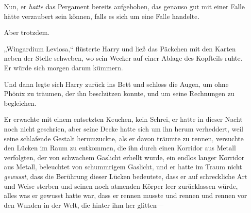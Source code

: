 Nun, er \emph{hatte} das Pergament bereits aufgehoben, das genauso gut mit einer Falle hätte verzaubert sein können, falls es sich um eine Falle handelte.

Aber trotzdem.

„Wingardium Leviosa,“ flüsterte Harry und ließ das Päckchen mit den Karten neben der Stelle schweben, wo sein Wecker auf einer Ablage des Kopfteils ruhte. Er würde sich morgen darum kümmern.

Und dann legte sich Harry zurück ins Bett und schloss die Augen, um ohne Phönix zu träumen, der ihn beschützen konnte, und um seine Rechnungen zu begleichen.

\later

Er erwachte mit einem entsetzten Keuchen, kein Schrei, er hatte in dieser Nacht noch nicht geschrien, aber seine Decke hatte sich um ihn herum verheddert, weil seine schlafende Gestalt herumzuckte, als er davon träumte zu rennen, versuchte den Lücken im Raum zu entkommen, die ihn durch einen Korridor aus Metall verfolgten, der von schwachem Gaslicht erhellt wurde, ein endlos langer Korridor aus Metall, beleuchtet von schummrigem Gaslicht, und er hatte im Traum nicht \emph{gewusst}, dass die Berührung dieser Lücken bedeutete, dass er auf schreckliche Art und Weise sterben und seinen noch atmenden Körper leer zurücklassen würde, alles was er gewusst hatte war, dass er rennen musste und rennen und rennen vor den Wunden in der Welt, die hinter ihm her glitten—

